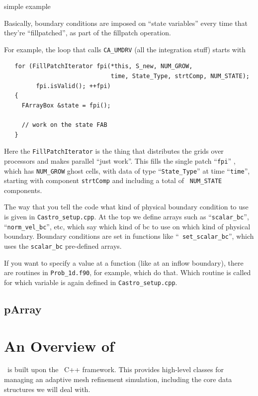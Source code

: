 {\color{red}simple example}

Basically, boundary conditions are imposed on ``state variables'' every
time that they're ``fillpatched'', as part of the fillpatch operation.

For example, the loop that calls {\tt CA\_UMDRV} (all the integration stuff) starts with
\begin{lstlisting}
   for (FillPatchIterator fpi(*this, S_new, NUM_GROW,
                              time, State_Type, strtComp, NUM_STATE);
         fpi.isValid(); ++fpi)
   {
     FArrayBox &state = fpi();

     // work on the state FAB
   }
\end{lstlisting}
Here the {\tt FillPatchIterator} is the thing that distributes the
grids over processors and makes parallel ``just work''. This fills the
single patch ``{\tt fpi}'' , which has {\tt NUM\_GROW} ghost cells,
with data of type ``{\tt State\_Type}'' at time ``{\tt time}'',
starting with component {\tt strtComp} and including a total of {\tt
  NUM\_STATE} components.

The way that you tell the code what kind of physical boundary
condition to use is given in {\tt Castro\_setup.cpp}. At the top we
define arrays such as ``{\tt scalar\_bc}'', ``{\tt norm\_vel\_bc}'',
etc, which say which kind of bc to use on which kind of physical
boundary.  Boundary conditions are set in functions like ``{\tt
  set\_scalar\_bc}'', which uses the {\tt scalar\_bc} pre-defined
arrays.

If you want to specify a value at a function (like at an inflow
boundary), there are routines in {\tt Prob\_1d.f90}, for example, which do
that. Which routine is called for which variable is again defined in
{\tt Castro\_setup.cpp}.


\subsection{pArray}



\section{An Overview of \castro}

\castro\ is built upon the \boxlib\ C++ framework.  This provides
high-level classes for managing an adaptive mesh refinement simulation,
including the core data structures we will deal with.

